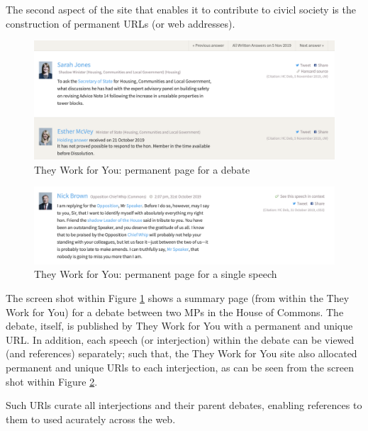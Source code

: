 The second aspect of the site that enables it to contribute to civicl society 
is the construction of permanent URLs (or web addresses).

\begin{figure}[h]
  \centering
  \includegraphics[scale=0.3]{images/they-work-for-you-implementation-permanent-urls-1}
  \caption{They Work for You: permanent page for a debate}
  \label{fig:/they-work-for-you-implementation-permanent-urls-1}
\end{figure}

\begin{figure}[h]
  \centering
  \includegraphics[scale=0.3]{images/they-work-for-you-implementation-permanent-urls-2}
  \caption{They Work for You: permanent page for a single speech}
  \label{fig:they-work-for-you-implementation-permanent-urls-2}
\end{figure}

The screen shot within Figure \ref{fig:/they-work-for-you-implementation-permanent-urls-1} shows a summary page (from within the They Work for You) for a debate between two MPs in the House of Commons. 
The debate, itself, is published by They Work for You with a permanent and unique URL.
In addition, each speech (or interjection) within the debate can be viewed (and references) separately; such that, the They Work for You site also allocated permanent and unique URls to each interjection, as can be seen from the screen shot within Figure \ref{fig:they-work-for-you-implementation-permanent-urls-2}.

Such URls curate all interjections and their parent debates, enabling references to them to used acurately across the web.